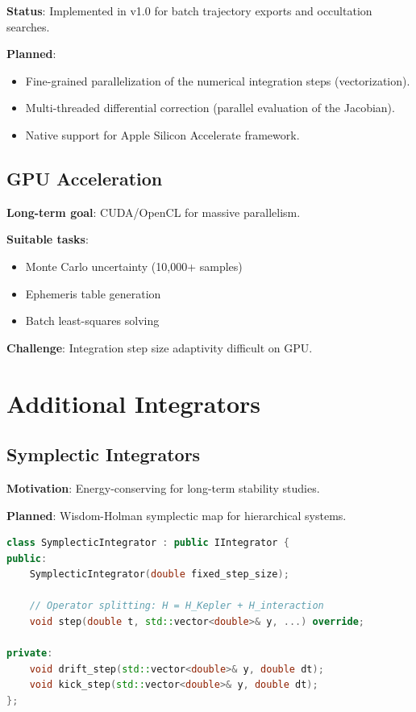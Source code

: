\textbf{Status}: Implemented in v1.0 for batch trajectory exports and occultation searches.

\textbf{Planned}:
\begin{itemize}
    \item Fine-grained parallelization of the numerical integration steps (vectorization).
    \item Multi-threaded differential correction (parallel evaluation of the Jacobian).
    \item Native support for Apple Silicon Accelerate framework.
\end{itemize}

\subsection{GPU Acceleration}

\textbf{Long-term goal}: CUDA/OpenCL for massive parallelism.

\textbf{Suitable tasks}:
\begin{itemize}
    \item Monte Carlo uncertainty (10,000+ samples)
    \item Ephemeris table generation
    \item Batch least-squares solving
\end{itemize}

\textbf{Challenge}: Integration step size adaptivity difficult on GPU.

\section{Additional Integrators}

\subsection{Symplectic Integrators}

\textbf{Motivation}: Energy-conserving for long-term stability studies.

\textbf{Planned}: Wisdom-Holman symplectic map for hierarchical systems.

\begin{lstlisting}[language=C++]
class SymplecticIntegrator : public IIntegrator {
public:
    SymplecticIntegrator(double fixed_step_size);
    
    // Operator splitting: H = H_Kepler + H_interaction
    void step(double t, std::vector<double>& y, ...) override;
    
private:
    void drift_step(std::vector<double>& y, double dt);
    void kick_step(std::vector<double>& y, double dt);
};
\end{lstlisting}

